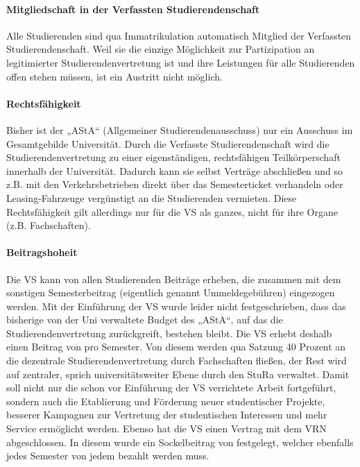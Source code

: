\paragraph{Mitgliedschaft in der Verfassten Studierendenschaft}

Alle Studierenden sind qua Immatrikulation automatisch Mitglied der Verfassten
Studierendenschaft. Weil sie die einzige Möglichkeit zur Partizipation an
legitimierter Studierendenvertretung ist und ihre Leistungen für alle
Studierenden offen stehen müssen, ist ein Austritt nicht möglich.

\paragraph{Rechtsfähigkeit}

Bisher ist der „AStA“ (Allgemeiner Studierendenausschuss) nur ein Ausschuss im
Gesamtgebilde Universität. Durch die Verfasste Studierendenschaft wird die
Studierendenvertretung zu einer eigenständigen, rechtsfähigen Teilkörperschaft
innerhalb der Universität. Dadurch kann sie selbst Verträge abschließen und so
z.B. mit den Verkehrsbetrieben direkt über das Semesterticket verhandeln oder
Leasing-Fahrzeuge vergünstigt an die Studierenden vermieten. Diese
Rechtsfähigkeit gilt allerdings nur für die VS als ganzes, nicht für ihre
Organe (z.B. Fachschaften).

\paragraph{Beitragshoheit}

Die VS kann von allen Studierenden Beiträge erheben, die zusammen mit dem
sonstigen Semesterbeitrag (eigentlich genannt Ummeldegebühren) eingezogen
werden. Mit der Einführung der VS wurde leider nicht festgeschrieben, dass das
bisherige von der Uni verwaltete Budget des „AStA“, auf das die
Studierendenvertretung zurückgreift, bestehen bleibt. Die VS erhebt deshalb
einen Beitrag von \EUR{\vsbeitrag} pro Semester. Von diesem werden qua Satzung 40
Prozent an die dezentrale Studierendenvertretung durch Fachschaften fließen,
der Rest wird auf zentraler, sprich universitätsweiter Ebene durch den StuRa
verwaltet. Damit soll nicht nur die schon vor Einführung der VS verrichtete
Arbeit fortgeführt, sondern auch die Etablierung und Förderung neuer
studentischer Projekte, besserer Kampagnen zur Vertretung der studentischen
Interessen und mehr Service ermöglicht werden. Ebenso hat die VS einen Vertrag
mit dem VRN abgeschlossen. In diesem wurde ein Sockelbeitrag von
\EUR{\sockelbeitrag} festgelegt, welcher ebenfalls jedes Semester von jedem
bezahlt werden muss.

